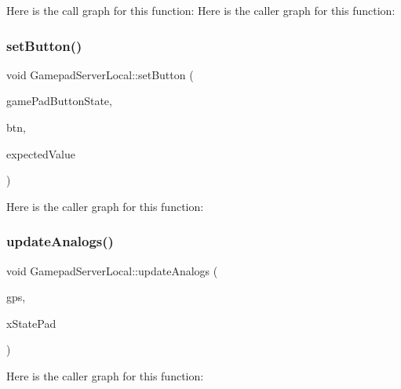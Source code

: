 Here is the call graph for this function\+:
Here is the caller graph for this function\+:
\mbox{\label{namespace_gamepad_server_local_a7ee9b0c4e1440fc1fc6cb45ac2cbf894}} 
\subsubsection{\texorpdfstring{set\+Button()}{setButton()}}
{\footnotesize\ttfamily void Gamepad\+Server\+Local\+::set\+Button (\begin{DoxyParamCaption}\item[{bool \&}]{game\+Pad\+Button\+State,  }\item[{const uint32\+\_\+t \&}]{btn,  }\item[{const uint32\+\_\+t \&}]{expected\+Value }\end{DoxyParamCaption})}

Here is the caller graph for this function\+:
\mbox{\label{namespace_gamepad_server_local_ae4392d183dc4e4a3743925fdbed23a0e}} 
\subsubsection{\texorpdfstring{update\+Analogs()}{updateAnalogs()}}
{\footnotesize\ttfamily void Gamepad\+Server\+Local\+::update\+Analogs (\begin{DoxyParamCaption}\item[{\mbox{\hyperlink{class_gamepad_state}{Gamepad\+State}} \&}]{gps,  }\item[{const X\+I\+N\+P\+U\+T\+\_\+\+G\+A\+M\+E\+P\+AD \&}]{x\+State\+Pad }\end{DoxyParamCaption})}

Here is the caller graph for this function\+:
\mbox{\label{namespace_gamepad_server_local_a1235679a5db743af26af2f68a2dcd3ce}} 
